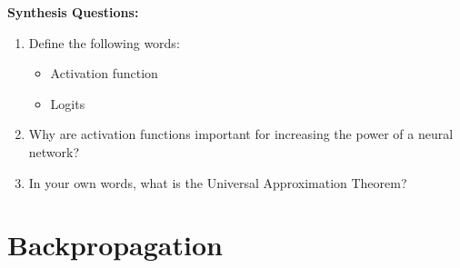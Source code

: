 \begin{questionbox}
    \textbf{Synthesis Questions:}
    \begin{enumerate}
        \item Define the following words:
        \begin{itemize}
            \item Activation function
            \item Logits
        \end{itemize}
        \item Why are activation functions important for increasing the power of a neural network?
        \item In your own words, what is the Universal Approximation Theorem?
    \end{enumerate}
\end{questionbox}

\section{Backpropagation}
